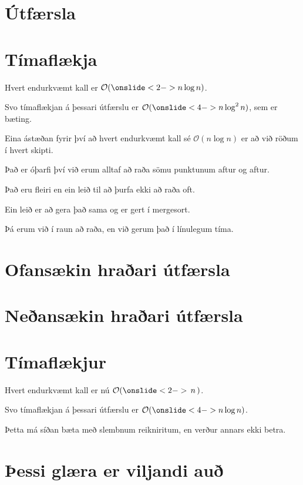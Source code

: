 \section{Útfærsla}
{
}

\section{Tímaflækja}
{
    {
        \item<1-> Hvert endurkvæmt kall er $\mathcal{O}(\onslide<2->{n \log n})$.
        \item<3-> Svo tímaflækjan á þessari útfærslu er $\mathcal{O}(\onslide<4->{n \log^2 n})$, sem er bæting.
        \item<5-> Eina ástæðan fyrir því að hvert endurkvæmt kall sé $\mathcal{O}(n \log n)$ er að við röðum í hvert skipti.
        \item<6-> Það er óþarfi því við erum alltaf að raða sömu punktunum aftur og aftur.
        \item<7-> Það eru fleiri en ein leið til að þurfa ekki að raða oft.
        \item<8-> Ein leið er að gera það sama og er gert í mergesort.
        \item<9-> Þá erum við í raun að raða, en við gerum það í línulegum tíma.
    }
}

\section{Ofansækin hraðari útfærsla}
{
}

\section{Neðansækin hraðari útfærsla}
{
}

\section{Tímaflækjur}
{
    {
        \item<1-> Hvert endurkvæmt kall er nú $\mathcal{O}(\onslide<2->{\,n\,})$.
        \item<3-> Svo tímaflækjan á þessari útfærslu er $\mathcal{O}(\onslide<4->{n \log n})$.
        \item<5-> Þetta má síðan bæta með slembnum reikniritum, en verður annars ekki betra.
    }
}

\section{Þessi glæra er viljandi auð}
{
}


